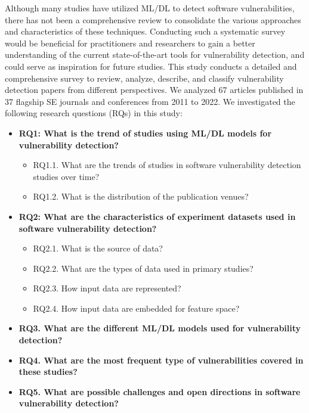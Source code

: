 Although many studies have utilized ML/DL to detect software vulnerabilities, there has not been a comprehensive review to consolidate the various approaches and characteristics of these techniques. Conducting such a systematic survey would be beneficial for practitioners and researchers to gain a better understanding of the current state-of-the-art tools for vulnerability detection, and could serve as inspiration for future studies. 
This study conducts a detailed and comprehensive survey to review, analyze, describe, and classify vulnerability detection papers from different perspectives. We analyzed 67 articles published in 37 flagship SE journals and conferences from 2011 to 2022. %
We investigated the following research questions (RQs) in this study:
\begin{itemize}
    \item \textbf{RQ1: What is the trend of studies using ML/DL models for vulnerability detection?}
    \begin{itemize}
        \item RQ1.1. What are the trends of studies in software vulnerability detection studies over time?
        \item RQ1.2. What is the distribution of the publication venues?
    \end{itemize}
    \item \textbf{RQ2: What are the characteristics of experiment datasets used in software vulnerability detection?}
    \begin{itemize}
    \item RQ2.1. What is the source of data?
    \item RQ2.2. What are the types of data used in primary studies?
    \item RQ2.3. How input data are represented?
    \item RQ2.4. How input data are embedded for feature space?
    \end{itemize}
    \item \textbf{RQ3. What are the different ML/DL models used for vulnerability detection?}
    \item \textbf{RQ4. What are the most frequent type of vulnerabilities covered in these studies?}
    \item \textbf{RQ5. What are possible challenges and open directions in software vulnerability detection?}
\end{itemize}
